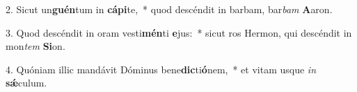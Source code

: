 2. Sicut un\textbf{guén}tum in \textbf{cá}\textbf{pi}te,~*  quod descéndit in barbam, bar\textit{bam} \textbf{A}aron.\

3. Quod descéndit in oram vesti\textbf{mén}ti \textbf{e}jus:~*  sicut ros Hermon, qui descéndit in mon\textit{tem} \textbf{Si}on.\

4. Quóniam illic mandávit Dóminus bene\textbf{dic}ti\textbf{ó}nem,~*  et vitam usque \textit{in} \textbf{sǽ}culum.\

